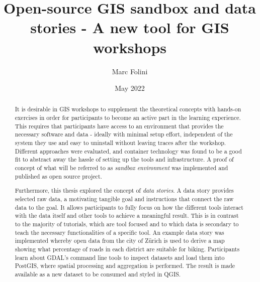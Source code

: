 \documentclass[11pt, a4paper, oneside, parskip=full-]{scrartcl}
\title{Open-source GIS sandbox and data stories - A new tool for GIS workshops}
\author{Marc Folini}
\date{May 2022}
\begin{document}
\begin{titlepage}
  \setcounter{page}{1}
  \clearpage\maketitle
  \thispagestyle{empty}
  \begin{abstract}
    It is desirable in GIS workshops to supplement the theoretical concepts with
    hands-on exercises in order for participants to become an active part in the
    learning experience. This requires that participants have access to an
    environment that provides the necessary software and data - ideally with
    minimal setup effort, independent of the system they use and easy to
    uninstall without leaving traces after the workshop. Different approaches
    were evaluated, and container technology was found to be a good fit to
    abstract away the hassle of setting up the tools and infrastructure. A proof
    of concept of what will be referred to as \emph{sandbox environment} was
    implemented and published as open source project.

    Furthermore, this thesis explored the concept of \emph{data stories}. A data
    story provides selected raw data, a motivating tangible goal and
    instructions that connect the raw data to the goal. It allows participants
    to fully focus on how the different tools interact with the data itself and
    other tools to achieve a meaningful result. This is in contrast to the
    majority of tutorials, which are tool focused and to which data is secondary
    to teach the necessary functionalities of a specific tool. An example data
    story was implemented whereby open data from the city of Zürich is used to
    derive a map showing what percentage of roads in each district are suitable
    for biking. Participants learn about GDAL's command line tools to inspect
    datasets and load them into PostGIS\cite{postgis}, where spatial processing
    and aggregation is performed. The result is made available as a new dataset
    to be consumed and styled in QGIS\cite{qgis}.
  \end{abstract}
\end{titlepage}

\newpage
\tableofcontents

\newpage
{}
\setcounter{page}{1}
\end{document}
